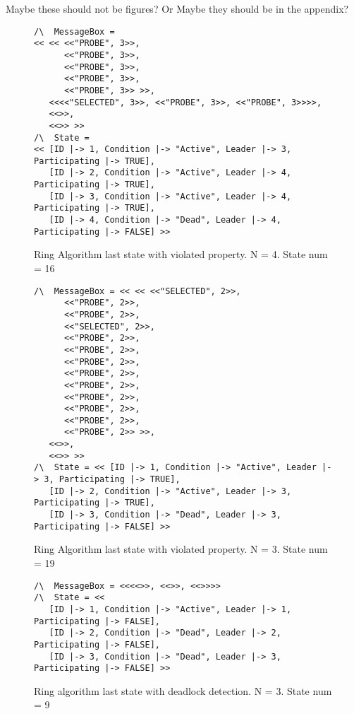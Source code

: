 \documentclass{report}
\begin{document}
\begin{callout}
  Maybe these should not be figures? Or Maybe they should be in the appendix?
  \end{callout}

\begin{figure}
  \begin{lstlisting}
/\  MessageBox =
<< << <<"PROBE", 3>>,
      <<"PROBE", 3>>,
      <<"PROBE", 3>>,
      <<"PROBE", 3>>,
      <<"PROBE", 3>> >>,
   <<<<"SELECTED", 3>>, <<"PROBE", 3>>, <<"PROBE", 3>>>>,
   <<>>,
   <<>> >>
/\  State =
<< [ID |-> 1, Condition |-> "Active", Leader |-> 3, Participating |-> TRUE],
   [ID |-> 2, Condition |-> "Active", Leader |-> 4, Participating |-> TRUE],
   [ID |-> 3, Condition |-> "Active", Leader |-> 4, Participating |-> TRUE],
   [ID |-> 4, Condition |-> "Dead", Leader |-> 4, Participating |-> FALSE] >>

  \end{lstlisting}

  \caption{Ring Algorithm last state with violated property. N = 4. State num = 16}
  \label{ringfailuren4}
\end{figure}

\begin{figure}
\begin{lstlisting}
/\  MessageBox = << << <<"SELECTED", 2>>,
      <<"PROBE", 2>>,
      <<"PROBE", 2>>,
      <<"SELECTED", 2>>,
      <<"PROBE", 2>>,
      <<"PROBE", 2>>,
      <<"PROBE", 2>>,
      <<"PROBE", 2>>,
      <<"PROBE", 2>>,
      <<"PROBE", 2>>,
      <<"PROBE", 2>>,
      <<"PROBE", 2>>,
      <<"PROBE", 2>> >>,
   <<>>,
   <<>> >>
/\  State = << [ID |-> 1, Condition |-> "Active", Leader |-> 3, Participating |-> TRUE],
   [ID |-> 2, Condition |-> "Active", Leader |-> 3, Participating |-> TRUE],
   [ID |-> 3, Condition |-> "Dead", Leader |-> 3, Participating |-> FALSE] >>

\end{lstlisting}

  \caption{Ring Algorithm last state with violated property. N = 3. State num = 19}
  \label{ringfailuren3}
\end{figure}

\begin{figure}
\begin{lstlisting}
/\  MessageBox = <<<<>>, <<>>, <<>>>>
/\  State = <<
   [ID |-> 1, Condition |-> "Active", Leader |-> 1, Participating |-> FALSE],
   [ID |-> 2, Condition |-> "Dead", Leader |-> 2, Participating |-> FALSE],
   [ID |-> 3, Condition |-> "Dead", Leader |-> 3, Participating |-> FALSE] >>
\end{lstlisting}

  \caption{Ring algorithm last state with deadlock detection. N = 3. State num = 9}
  \label{ringdeadlocksuccess}
\end{figure}
\end{document}
